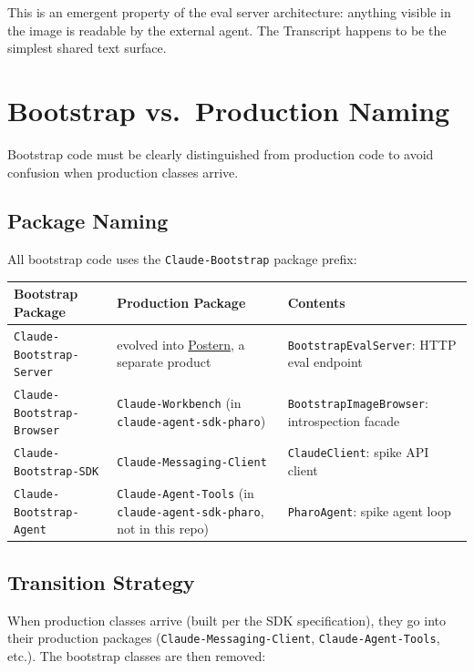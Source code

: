 \documentclass[a4paper,10pt,fleqn]{article}
\newcommand{\cls}[1]{\texttt{#1}}
\newcommand{\pkg}[1]{\texttt{#1}}
\begin{document}
This is an emergent property of the eval server architecture: anything
visible in the image is readable by the external agent.  The Transcript
happens to be the simplest shared text surface.

\section{Bootstrap vs.\ Production Naming}

Bootstrap code must be clearly distinguished from production code to
avoid confusion when production classes arrive.

\subsection{Package Naming}

All bootstrap code uses the \pkg{Claude-Bootstrap} package prefix:

\begin{center}
\begin{tabularx}{\linewidth}{@{}llY@{}}
\toprule
\textbf{Bootstrap Package} & \textbf{Production Package} & \textbf{Contents} \\
\midrule
\pkg{Claude-Bootstrap-Server}  & evolved into
  \href{https://github.com/punt-labs/postern}{Postern}, a separate
  product &
  \cls{BootstrapEvalServer}: HTTP eval endpoint \\
\pkg{Claude-Bootstrap-Browser} & \pkg{Claude-Workbench} (in
  \texttt{claude-agent-sdk-pharo}) &
  \cls{BootstrapImageBrowser}: introspection facade \\
\pkg{Claude-Bootstrap-SDK}     & \pkg{Claude-Messaging-Client} &
  \cls{ClaudeClient}: spike API client \\
\pkg{Claude-Bootstrap-Agent}   & \pkg{Claude-Agent-Tools} (in
  \texttt{claude-agent-sdk-pharo}, not in this repo) &
  \cls{PharoAgent}: spike agent loop \\
\bottomrule
\end{tabularx}
\end{center}

\subsection{Transition Strategy}

When production classes arrive (built per the SDK specification),
they go into their production packages (\pkg{Claude-Messaging-Client},
\pkg{Claude-Agent-Tools}, etc.).  The bootstrap classes are then
removed:
\end{document}
